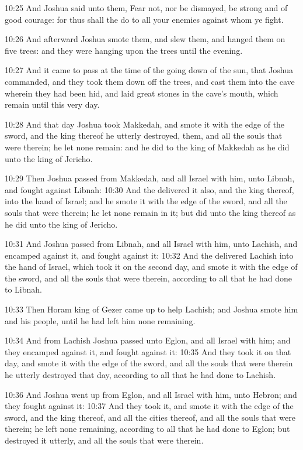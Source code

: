 10:25 And Joshua said unto them, Fear not, nor be dismayed, be strong and of good courage: for thus shall the \LORD do to all your enemies against whom ye fight.

10:26 And afterward Joshua smote them, and slew them, and hanged them on five trees: and they were hanging upon the trees until the evening.

10:27 And it came to pass at the time of the going down of the sun, that Joshua commanded, and they took them down off the trees, and cast them into the cave wherein they had been hid, and laid great stones in the cave's mouth, which remain until this very day.

10:28 And that day Joshua took Makkedah, and smote it with the edge of the sword, and the king thereof he utterly destroyed, them, and all the souls that were therein; he let none remain: and he did to the king of Makkedah as he did unto the king of Jericho.

10:29 Then Joshua passed from Makkedah, and all Israel with him, unto Libnah, and fought against Libnah: 10:30 And the \LORD delivered it also, and the king thereof, into the hand of Israel; and he smote it with the edge of the sword, and all the souls that were therein; he let none remain in it; but did unto the king thereof as he did unto the king of Jericho.

10:31 And Joshua passed from Libnah, and all Israel with him, unto Lachish, and encamped against it, and fought against it: 10:32 And the \LORD delivered Lachish into the hand of Israel, which took it on the second day, and smote it with the edge of the sword, and all the souls that were therein, according to all that he had done to Libnah.

10:33 Then Horam king of Gezer came up to help Lachish; and Joshua smote him and his people, until he had left him none remaining.

10:34 And from Lachish Joshua passed unto Eglon, and all Israel with him; and they encamped against it, and fought against it: 10:35 And they took it on that day, and smote it with the edge of the sword, and all the souls that were therein he utterly destroyed that day, according to all that he had done to Lachish.

10:36 And Joshua went up from Eglon, and all Israel with him, unto Hebron; and they fought against it: 10:37 And they took it, and smote it with the edge of the sword, and the king thereof, and all the cities thereof, and all the souls that were therein; he left none remaining, according to all that he had done to Eglon; but destroyed it utterly, and all the souls that were therein.

